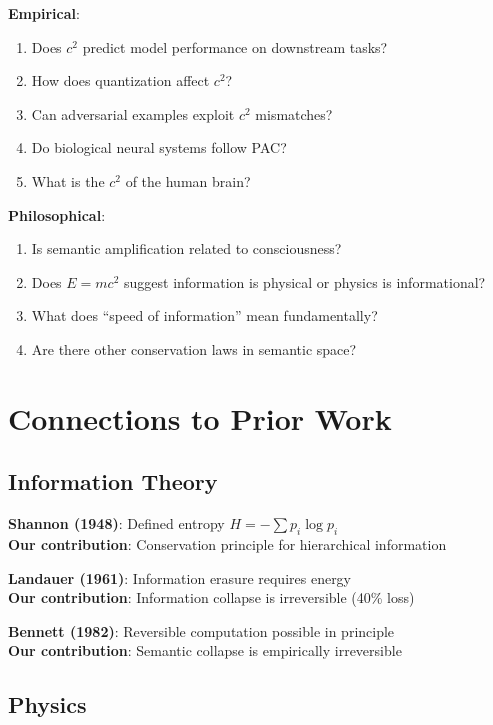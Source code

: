 \documentclass[11pt,a4paper]{article}
\begin{document}
\textbf{Empirical}:
\begin{enumerate}
    \item Does $c^2$ predict model performance on downstream tasks?
    \item How does quantization affect $c^2$?
    \item Can adversarial examples exploit $c^2$ mismatches?
    \item Do biological neural systems follow PAC?
    \item What is the $c^2$ of the human brain?
\end{enumerate}

\textbf{Philosophical}:
\begin{enumerate}
    \item Is semantic amplification related to consciousness?
    \item Does $E=mc^2$ suggest information is physical or physics is informational?
    \item What does ``speed of information'' mean fundamentally?
    \item Are there other conservation laws in semantic space?
\end{enumerate}

\section{Connections to Prior Work}

\subsection{Information Theory}

\textbf{Shannon (1948)}: Defined entropy $H = -\sum p_i \log p_i$\\
\textbf{Our contribution}: Conservation principle for hierarchical information

\textbf{Landauer (1961)}: Information erasure requires energy\\
\textbf{Our contribution}: Information collapse is irreversible (40\% loss)

\textbf{Bennett (1982)}: Reversible computation possible in principle\\
\textbf{Our contribution}: Semantic collapse is empirically irreversible

\subsection{Physics}
\end{document}

